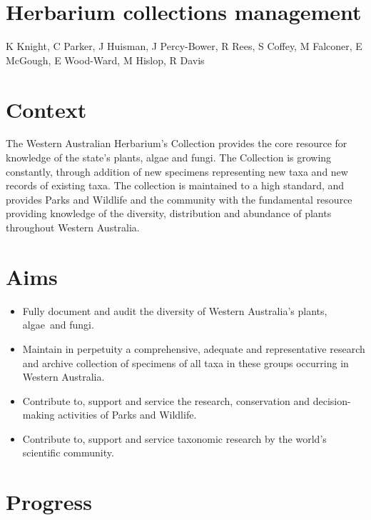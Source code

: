 \documentclass[version=last,
    paper=a4, %
    10pt, %
    usenames,
    dvipsnames,
    oneside, %
    headings=openany, %
    DIV=15 %
]{scrbook}
\begin{document}
\section*{Herbarium collections management
}

K Knight, C Parker, J Huisman, J Percy-Bower, R Rees, S Coffey, M
Falconer, E McGough, E Wood-Ward, M Hislop, R Davis



\section*{Context}

The Western Australian Herbarium's Collection provides the core resource
for knowledge of the state's plants, algae and fungi. The Collection is
growing constantly, through addition of new specimens representing new
taxa and new records of existing taxa. The collection is maintained to a
high standard, and provides Parks and Wildlife and the community with
the fundamental resource providing knowledge of the diversity,
distribution and abundance of plants throughout Western Australia.




\section*{Aims}

\begin{itemize}
\itemsep1pt\parskip0pt
\item
  Fully document and audit the diversity of Western Australia's plants,
  algae~and fungi.
\item
  Maintain in perpetuity a comprehensive, adequate and representative
  research and archive collection of specimens of all taxa in these
  groups occurring in Western Australia.
\item
  Contribute to, support and service the research, conservation and
  decision-making activities of Parks and Wildlife.
\item
  Contribute to, support and service taxonomic research by the world's
  scientific community.
\end{itemize}




\section*{Progress}
\end{document}

